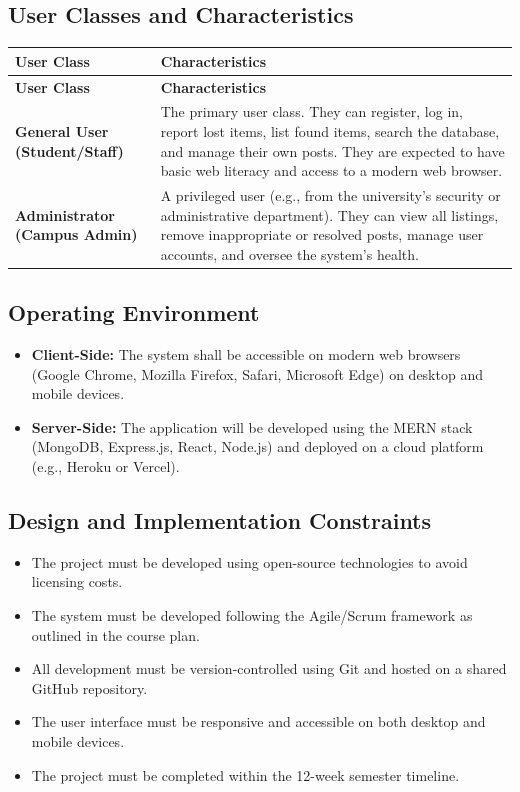 \documentclass[11pt, a4paper]{article}
\begin{document}
\subsection{User Classes and Characteristics}
\begin{longtable}{|p{4cm}|p{11cm}|}
    \hline
    \textbf{User Class} & \textbf{Characteristics} \\
    \hline
    \endfirsthead
    \hline
    \textbf{User Class} & \textbf{Characteristics} \\
    \hline
    \endhead
    \textbf{General User (Student/Staff)} & The primary user class. They can register, log in, report lost items, list found items, search the database, and manage their own posts. They are expected to have basic web literacy and access to a modern web browser. \\
    \hline
    \textbf{Administrator (Campus Admin)} & A privileged user (e.g., from the university's security or administrative department). They can view all listings, remove inappropriate or resolved posts, manage user accounts, and oversee the system's health. \\
    \hline
\end{longtable}

\subsection{Operating Environment}
\begin{itemize}
    \item \textbf{Client-Side:} The system shall be accessible on modern web browsers (Google Chrome, Mozilla Firefox, Safari, Microsoft Edge) on desktop and mobile devices.
    \item \textbf{Server-Side:} The application will be developed using the MERN stack (MongoDB, Express.js, React, Node.js) and deployed on a cloud platform (e.g., Heroku or Vercel).
\end{itemize}

\subsection{Design and Implementation Constraints}
\begin{itemize}
    \item The project must be developed using open-source technologies to avoid licensing costs.
    \item The system must be developed following the Agile/Scrum framework as outlined in the course plan.
    \item All development must be version-controlled using Git and hosted on a shared GitHub repository.
    \item The user interface must be responsive and accessible on both desktop and mobile devices.
    \item The project must be completed within the 12-week semester timeline.
\end{itemize}
\end{document}
